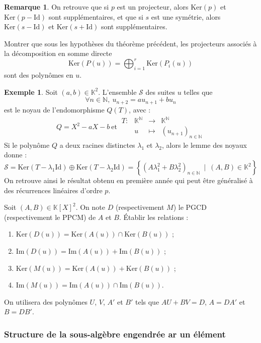 \documentclass[french]{article}
\newcommand{\N}{\mathbb{N}}
\newcommand{\K}{\mathbb{K}}
\renewcommand{\ker}{\text{Ker}}
\theoremstyle{plain}
\theoremstyle{definition}
\newtheorem*{ex}{Exemple}
\newtheorem*{rmq}{Remarque}
\theoremstyle{remark}
\begin{document}
\begin{rmq}
	On retrouve que si $p$ est un projecteur, alors $\ker(p)$ et $\ker(p-\text{Id})$ sont supplémentaires, et que si $s$ est une symétrie, alors $\ker(s-\text{Id})$ et $\ker(s+\text{Id})$ sont supplémentaires.
\end{rmq}

\begin{exo}
	Montrer que sous les hypothèses du théorème précédent, les projecteurs associés à la décomposition en somme directe $$\ker(P(u))=\bigoplus_{i=1}^r\ker(P_i(u))$$ sont des polynômes en $u$.
\end{exo}

\begin{ex}
	Soit $(a,b)\in\K^2$. L'ensemble $\mathcal{S}$ des suites $u$ telles que $$\forall n\in\N,\ u_{n+2}=au_{n+1}+bu_n$$ est le noyau de l'endomorphisme $Q(T)$, avec : $$Q=X^2-aX-b\ \text{et}\ \begin{array}{lrcl}
		T:&\K^\N&\longrightarrow&\K^\N\\
		&u&\longmapsto&(u_{n+1})_{n\in\N}
	\end{array}$$ Si le polynôme $Q$ a deux racines distinctes $\lambda_1$ et $\lambda_2$, alors le lemme des noyaux donne : $$\mathcal{S}=\ker(T-\lambda_1\text{Id})\oplus\ker(T-\lambda_2\text{Id})=\left\{(A\lambda_1^2+B\lambda_2^2)_{n\in\N}\ \mid\ (A,B)\in\K^2\right\}$$ On retrouve ainsi le résultat obtenu en première année qui peut être généralisé à des récurrences linéaires d'ordre $p$.
\end{ex}

\begin{exo}
	Soit $(A,B)\in\K[X]^2$. On note $D$ (respectivement $M$) le PGCD (respectivement le PPCM) de $A$ et $B$. Établir les relations :
	\begin{enumerate}
		\item $\ker(D(u))=\ker(A(u))\cap\ker(B(u))$ ;
		\item $\text{Im}(D(u))=\text{Im}(A(u))+\text{Im}(B(u))$ ;
		\item $\ker(M(u))=\ker(A(u))+\ker(B(u))$ ;
		\item $\text{Im}(M(u))=\text{Im}(A(u))\cap\text{Im}(B(u))$.
	\end{enumerate}
	On utilisera des polynômes $U$, $V$, $A'$ et $B'$ tels que $AU+BV=D$, $A=DA'$ et $B=DB'$.
\end{exo}

\subsubsection*{Structure de la sous-algèbre engendrée ar un élément}
\end{document}
